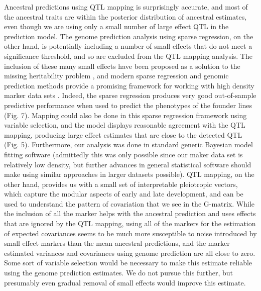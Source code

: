 \begin{refsection}
Ancestral predictions using QTL mapping is surprisingly accurate, and
most of the ancestral traits are within the posterior distribution of
ancestral estimates, even though we are using only a small number of
large effect QTL in the prediction model. The genome prediction analysis
using sparse regression, on the other hand, is potentially including a
number of small effects that do not meet a significance threshold, and
so are excluded from the QTL mapping analysis. The inclusion of these
many small effects have been proposed as a solution to the missing
heritability problem \parencite{Bloom2013-xc}, and modern sparse regression and genomic prediction
methods provide a promising framework for working with high density
marker data sets \parencite{Pong-Wong2014-vj}. Indeed, the sparse regression produces very good out-of-sample
predictive performance when used to predict the phenotypes of the
founder lines (Fig. 7). Mapping could also be done in this sparse
regression framework using variable selection, and the model displays
reasonable agreement with the QTL mapping, producing large effect
estimates that are close to the detected QTL (Fig. 5). Furthermore, our
analysis was done in standard generic Bayesian model fitting software
(admittedly this was only possible since our maker data set is
relatively low density, but further advances in general statistical
software should make using similar approaches in larger datasets
possible). QTL mapping, on the other hand, provides us with a small set
of interpretable pleiotropic vectors, which capture the modular aspects
of early and late development, and can be used to understand the pattern
of covariation that we see in the G-matrix. While the inclusion of all
the marker helps with the ancestral prediction and uses effects that are
ignored by the QTL mapping, using all of the markers for the estimation
of expected covariances seems to be much more susceptible to noise
introduced by small effect markers than the mean ancestral predictions,
and the marker estimated variances and covariances using genome
prediction are all close to zero. Some sort of variable selection would
be necessary to make this estimate reliable using the genome prediction
estimates. We do not pursue this further, but presumably even gradual
removal of small effects would improve this estimate.


\end{refsection}
